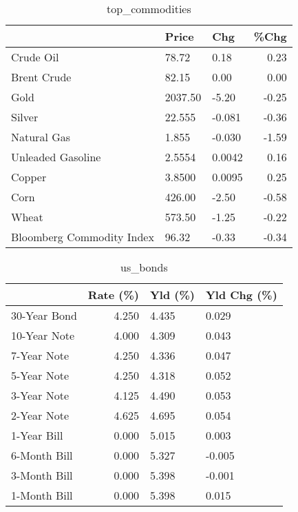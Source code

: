 \documentclass{article}%
\begin{document}
\begin{table}[htbp]%
\caption{top\_commodities}%
\centering%
\begin{adjustbox}{width=1\textwidth}%
\begin{tabular}{lllr}
\toprule
                          &   Price &    Chg &  \%Chg \\
\midrule
               Crude Oil  &   78.72 &   0.18 &  0.23 \\
             Brent Crude  &   82.15 &   0.00 &  0.00 \\
                    Gold  & 2037.50 &  -5.20 & -0.25 \\
                  Silver  &  22.555 & -0.081 & -0.36 \\
             Natural Gas  &   1.855 & -0.030 & -1.59 \\
       Unleaded Gasoline  &  2.5554 & 0.0042 &  0.16 \\
                  Copper  &  3.8500 & 0.0095 &  0.25 \\
                    Corn  &  426.00 &  -2.50 & -0.58 \\
                   Wheat  &  573.50 &  -1.25 & -0.22 \\
Bloomberg Commodity Index &   96.32 &  -0.33 & -0.34 \\
\bottomrule
\end{tabular}
%
\end{adjustbox}%
\end{table}

%


\begin{table}[htbp]%
\caption{us\_bonds}%
\centering%
\begin{adjustbox}{width=1\textwidth}%
\begin{tabular}{lrll}
\toprule
             &  Rate (\%) & Yld (\%) & Yld Chg (\%) \\
\midrule
30-Year Bond &     4.250 &   4.435 &       0.029 \\
10-Year Note &     4.000 &   4.309 &       0.043 \\
 7-Year Note &     4.250 &   4.336 &       0.047 \\
 5-Year Note &     4.250 &   4.318 &       0.052 \\
 3-Year Note &     4.125 &   4.490 &       0.053 \\
 2-Year Note &     4.625 &   4.695 &       0.054 \\
 1-Year Bill &     0.000 &   5.015 &       0.003 \\
6-Month Bill &     0.000 &   5.327 &      -0.005 \\
3-Month Bill &     0.000 &   5.398 &      -0.001 \\
1-Month Bill &     0.000 &   5.398 &       0.015 \\
\bottomrule
\end{tabular}
%
\end{adjustbox}%
\end{table}
\end{document}
